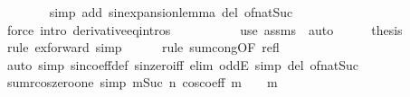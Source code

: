 \begin{isabellebody}
\ \ \ \ \ \ \isamarkupfalse%
\ {\isacharparenleft}{\kern0pt}simp\ add{\isacharcolon}{\kern0pt}\ sin{\isacharunderscore}{\kern0pt}expansion{\isacharunderscore}{\kern0pt}lemma\ del{\isacharcolon}{\kern0pt}\ of{\isacharunderscore}{\kern0pt}nat{\isacharunderscore}{\kern0pt}Suc{\isacharparenright}{\kern0pt}\isanewline
\ \ \ \ \ \ \isamarkupfalse%
\ {\isacharparenleft}{\kern0pt}force\ intro{\isacharbang}{\kern0pt}{\isacharcolon}{\kern0pt}\ derivative{\isacharunderscore}{\kern0pt}eq{\isacharunderscore}{\kern0pt}intros{\isacharparenright}{\kern0pt}\isanewline
\ \ \ \ \ \ \isamarkupfalse%
\isanewline
\ \ \isamarkupfalse%
\ {\isacharparenleft}{\kern0pt}use\ assms\ \ auto{\isacharparenright}{\kern0pt}\isanewline
\ \ \isamarkupfalse%
\ \isamarkupfalse%
\ {\isacharquery}{\kern0pt}thesis\isanewline
\ \ \ \ \isamarkupfalse%
\ {\isacharparenleft}{\kern0pt}rule\ ex{\isacharunderscore}{\kern0pt}forward{\isacharcomma}{\kern0pt}\ simp{\isacharparenright}{\kern0pt}\isanewline
\ \ \ \ \isamarkupfalse%
\ {\isacharparenleft}{\kern0pt}rule\ sum{\isachardot}{\kern0pt}cong{\isacharbrackleft}{\kern0pt}OF\ refl{\isacharbrackright}{\kern0pt}{\isacharparenright}{\kern0pt}\isanewline
\ \ \ \ \isamarkupfalse%
\ {\isacharparenleft}{\kern0pt}auto\ simp{\isacharcolon}{\kern0pt}\ sin{\isacharunderscore}{\kern0pt}coeff{\isacharunderscore}{\kern0pt}def\ sin{\isacharunderscore}{\kern0pt}zero{\isacharunderscore}{\kern0pt}iff\ elim{\isacharcolon}{\kern0pt}\ oddE\ simp\ del{\isacharcolon}{\kern0pt}\ of{\isacharunderscore}{\kern0pt}nat{\isacharunderscore}{\kern0pt}Suc{\isacharparenright}{\kern0pt}\isanewline
\ \ \ \ \isamarkupfalse%
\isanewline
{}\isamarkupfalse%
%
\endisatagproof
{\isafoldproof}%
%
\isadelimproof
%
\endisadelimproof
%
\isadelimdocument
%
\endisadelimdocument
%
\isatagdocument
%
\isamarkuptrue%
%
\endisatagdocument
{\isafolddocument}%
%
\isadelimdocument
%
\endisadelimdocument
{}\isamarkupfalse%
\ sumr{\isacharunderscore}{\kern0pt}cos{\isacharunderscore}{\kern0pt}zero{\isacharunderscore}{\kern0pt}one\ {\isacharbrackleft}{\kern0pt}simp{\isacharbrackright}{\kern0pt}{\isacharcolon}{\kern0pt}\ {\isachardoublequoteopen}{\isacharparenleft}{\kern0pt}{\isasymSum}m{\isacharless}{\kern0pt}Suc\ n{\isachardot}{\kern0pt}\ cos{\isacharunderscore}{\kern0pt}coeff\ m\ {\isacharasterisk}{\kern0pt}\ {}\ {\isacharcircum}{\kern0pt}\ m{\isacharparenright}{\kern0pt}\ {\isacharequal}{\kern0pt}\ {}{\isachardoublequoteclose}\isanewline

\end{isabellebody}
